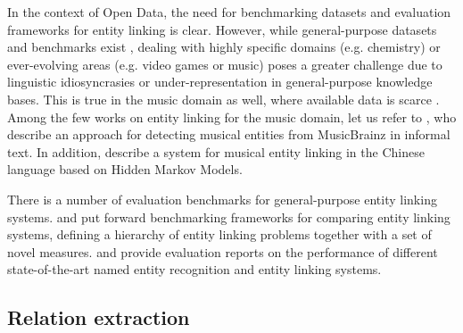 In the context of Open Data, the need for benchmarking datasets and evaluation frameworks for entity linking is clear. However, while general-purpose datasets and benchmarks exist \citep{Usbeck2015}, dealing with highly specific domains (e.g. chemistry) or ever-evolving areas (e.g. video games or music) poses a greater challenge due to linguistic idiosyncrasies or under-representation in general-purpose knowledge bases. This is true in the music domain as well, where available data is scarce \citep{Pereira2014}. %
Among the few works on entity linking for the music domain, let us refer to \cite{Gruhl2009}, who describe an approach for detecting musical entities from MusicBrainz in informal text. In addition, \cite{Zhang2009} describe a system for musical entity linking in the Chinese language based on Hidden Markov Models. 

There is a number of evaluation benchmarks for general-purpose entity linking systems. \cite{Cornolti2013} and \cite{Usbeck2015} put forward benchmarking frameworks for comparing entity linking systems, defining a hierarchy of entity linking problems together with a set of novel measures. \cite{Rizzo2014} and \cite{Gangemi2013} provide evaluation reports on the performance of different state-of-the-art named entity recognition and entity linking systems. %



\subsection{Relation extraction}
\label{sec:SOA:nlu:relation_extraction}


